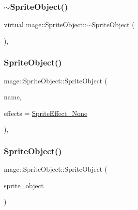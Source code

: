 \subsubsection{\texorpdfstring{$\sim$\+Sprite\+Object()}{~SpriteObject()}}
{\footnotesize\ttfamily virtual mage\+::\+Sprite\+Object\+::$\sim$\+Sprite\+Object (\begin{DoxyParamCaption}{ }\end{DoxyParamCaption})\hspace{0.3cm}{\ttfamily [virtual]}, {\ttfamily [default]}}

\hypertarget{classmage_1_1_sprite_object_a1d487cfddfd6e3f60047f9316522ba8b}{}\label{classmage_1_1_sprite_object_a1d487cfddfd6e3f60047f9316522ba8b} 
\subsubsection{\texorpdfstring{Sprite\+Object()}{SpriteObject()}\hspace{0.1cm}{\footnotesize\ttfamily [1/3]}}
{\footnotesize\ttfamily mage\+::\+Sprite\+Object\+::\+Sprite\+Object (\begin{DoxyParamCaption}\item[{const string \&}]{name,  }\item[{\hyperlink{namespacemage_a9cfe18123066ba4236f548f9de75d881}{Sprite\+Effect}}]{effects = {\ttfamily \hyperlink{namespacemage_a9cfe18123066ba4236f548f9de75d881af3c275fbfacfe174da928b2f24dfa515}{Sprite\+Effect\+\_\+\+None}} }\end{DoxyParamCaption})\hspace{0.3cm}{\ttfamily [explicit]}, {\ttfamily [protected]}}

\hypertarget{classmage_1_1_sprite_object_ac75871029cd740aeb0dd3e23d037b703}{}\label{classmage_1_1_sprite_object_ac75871029cd740aeb0dd3e23d037b703} 
\subsubsection{\texorpdfstring{Sprite\+Object()}{SpriteObject()}\hspace{0.1cm}{\footnotesize\ttfamily [2/3]}}
{\footnotesize\ttfamily mage\+::\+Sprite\+Object\+::\+Sprite\+Object (\begin{DoxyParamCaption}\item[{const \hyperlink{classmage_1_1_sprite_object}{Sprite\+Object} \&}]{sprite\+\_\+object }\end{DoxyParamCaption})\hspace{0.3cm}{\ttfamily [protected]}}

